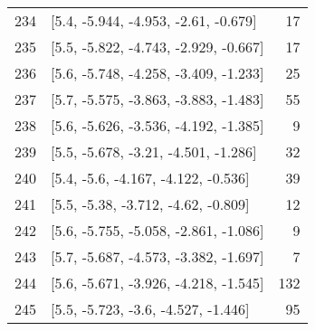 \documentclass{article}%
\begin{document}
\begin{longtable}{llr}
234 &   [5.4, -5.944, -4.953, -2.61, -0.679] &      17 \\
235 &  [5.5, -5.822, -4.743, -2.929, -0.667] &      17 \\
236 &  [5.6, -5.748, -4.258, -3.409, -1.233] &      25 \\
237 &  [5.7, -5.575, -3.863, -3.883, -1.483] &      55 \\
238 &  [5.6, -5.626, -3.536, -4.192, -1.385] &       9 \\
239 &   [5.5, -5.678, -3.21, -4.501, -1.286] &      32 \\
240 &    [5.4, -5.6, -4.167, -4.122, -0.536] &      39 \\
241 &    [5.5, -5.38, -3.712, -4.62, -0.809] &      12 \\
242 &  [5.6, -5.755, -5.058, -2.861, -1.086] &       9 \\
243 &  [5.7, -5.687, -4.573, -3.382, -1.697] &       7 \\
244 &  [5.6, -5.671, -3.926, -4.218, -1.545] &     132 \\
245 &    [5.5, -5.723, -3.6, -4.527, -1.446] &      95 \\
\end{longtable}

%
\end{document}
